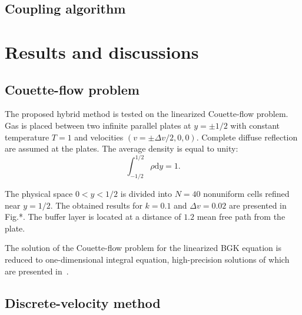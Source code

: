 \documentclass{article}
\theoremstyle{plain}
\newcommand{\dd}{\mathrm{d}}
\begin{document}
\subsection{Coupling algorithm}

\section{Results and discussions}

\subsection{Couette-flow problem}

The proposed hybrid method is tested on the linearized Couette-flow problem.
Gas is placed between two infinite parallel plates at \(y=\pm1/2\) with constant temperature \(T=1\)
and velocities \((v = \pm\Delta v/2, 0, 0)\).
Complete diffuse reflection are assumed at the plates.
The average density is equal to unity:
\begin{equation}\label{eq:total_mass}
    \int_{-1/2}^{1/2}\rho\dd{y} = 1.
\end{equation}

The physical space \(0<y<1/2\) is divided into \(N=40\) nonuniform cells refined near \(y=1/2\).
The obtained results for \(k=0.1\) and \(\Delta v = 0.02\) are presented in Fig.*.
The buffer layer is located at a distance of \(1.2\) mean free path from the plate.

The solution of the Couette-flow problem for the linearized BGK equation is reduced to one-dimensional integral equation,
high-precision solutions of which are presented in~\cite{Luo2015, Luo2016}.


\subsection{Discrete-velocity method}
\end{document}
